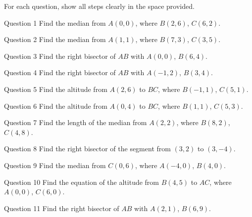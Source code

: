 \documentclass[11pt]{article}
\begin{document}
\clearpage
{}
For each question, show all steps clearly in the space provided.

\begin{qbox}{Question 1}
Find the median from $A(0,0)$, where $B(2,6)$, $C(6,2)$.\workspace{2.6cm}
\end{qbox}

\begin{qbox}{Question 2}
Find the median from $A(1,1)$, where $B(7,3)$, $C(3,5)$.\workspace{2.6cm}
\end{qbox}

\begin{qbox}{Question 3}
Find the right bisector of $AB$ with $A(0,0)$, $B(6,4)$.\workspace{2.6cm}
\end{qbox}

\begin{qbox}{Question 4}
Find the right bisector of $AB$ with $A(-1,2)$, $B(3,4)$.\workspace{2.6cm}
\end{qbox}

\begin{qbox}{Question 5}
Find the altitude from $A(2,6)$ to $BC$, where $B(-1,1)$, $C(5,1)$.\workspace{2.4cm}
\end{qbox}

\begin{qbox}{Question 6}
Find the altitude from $A(0,4)$ to $BC$, where $B(1,1)$, $C(5,3)$.\workspace{2.6cm}
\end{qbox}

\begin{qbox}{Question 7}
Find the length of the median from $A(2,2)$, where $B(8,2)$, $C(4,8)$.\workspace{2.6cm}
\end{qbox}

\begin{qbox}{Question 8}
Find the right bisector of the segment from $(3,2)$ to $(3,-4)$.\workspace{2.4cm}
\end{qbox}

\begin{qbox}{Question 9}
Find the median from $C(0,6)$, where $A(-4,0)$, $B(4,0)$.\workspace{2.4cm}
\end{qbox}

\begin{qbox}{Question 10}
Find the equation of the altitude from $B(4,5)$ to $AC$, where $A(0,0)$, $C(6,0)$.\workspace{2.4cm}
\end{qbox}

\begin{qbox}{Question 11}
Find the right bisector of $AB$ with $A(2,1)$, $B(6,9)$.\workspace{2.6cm}
\end{qbox}
\end{document}
